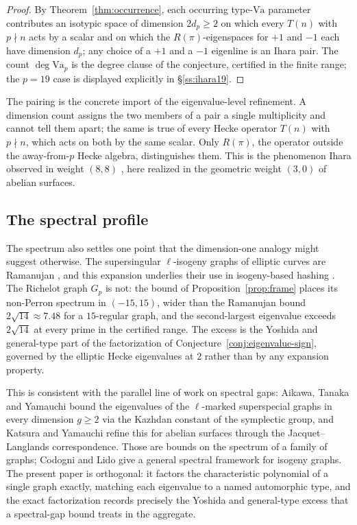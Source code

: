 \documentclass[11pt]{amsart}
\theoremstyle{plain}
\theoremstyle{definition}
\newcommand{\Va}{\mathrm{Va}}
\providecommand{\Va}{\mathrm{Va}}
\begin{document}
	\begin{proof}
		By Theorem~\ref{thm:occurrence}, each occurring type-$\Va$ parameter
		contributes an isotypic space of dimension $2d_p\ge2$ on which every
		$T(n)$ with $p\nmid n$ acts by a scalar and on which the
		$R(\pi)$-eigenspaces for $+1$ and $-1$ each have dimension $d_p$; any
		choice of a $+1$ and a $-1$ eigenline is an Ihara pair. The count
		$\deg\Va_p$ is the degree clause of the conjecture, certified in the
		finite range; the $p=19$ case is displayed explicitly in
		\S\ref{ss:ihara19}.
	\end{proof}
	
	The pairing is the concrete import of the eigenvalue-level refinement. A
	dimension count assigns the two members of a pair a single multiplicity
	and cannot tell them apart; the same is true of every Hecke operator
	$T(n)$ with $p\nmid n$, which acts on both by the same scalar. Only
	$R(\pi)$, the operator outside the away-from-$p$ Hecke algebra,
	distinguishes them. This is the phenomenon Ihara observed in weight
	$(8,8)$ \cite{Ihara1967}, here realized in the geometric weight $(3,0)$ of
	abelian surfaces.
	
	\subsection{The spectral profile}
	\label{ss:spectral-profile}
	
	The spectrum also settles one point that the dimension-one analogy might
	suggest otherwise. The supersingular $\ell$-isogeny graphs of elliptic
	curves are Ramanujan \cite{Pizer1990}, and this expansion underlies their
	use in isogeny-based hashing \cite{CGL2009}. The Richelot graph $G_p$ is
	not: the bound of Proposition~\ref{prop:frame} places its non-Perron
	spectrum in $(-15,15)$, wider than the Ramanujan bound $2\sqrt{14}\approx
	7.48$ for a $15$-regular graph, and the second-largest eigenvalue exceeds
	$2\sqrt{14}$ at every prime in the certified range. The excess is the
	Yoshida and general-type part of the factorization of
	Conjecture~\ref{conj:eigenvalue-sign}, governed by the elliptic Hecke
	eigenvalues at $2$ rather than by any expansion property.
	
	This is consistent with the parallel line of work on spectral gaps:
	Aikawa, Tanaka and Yamauchi \cite{AikawaTanakaYamauchi} bound the
	eigenvalues of the $\ell$-marked superspecial graphs in every dimension
	$g\ge2$ via the Kazhdan constant of the symplectic group, and Katsura and
	Yamauchi \cite{KatsuraYamauchi} refine this for abelian surfaces through
	the Jacquet--Langlands correspondence. Those are bounds on the spectrum of
	a family of graphs; Codogni and Lido \cite{CodogniLido} give a general
	spectral framework for isogeny graphs. The present paper is orthogonal: it factors the
	characteristic polynomial of a single graph exactly, matching each
	eigenvalue to a named automorphic type, and the exact factorization
	records precisely the Yoshida and general-type excess that a spectral-gap
	bound treats in the aggregate.
	
\end{document}
